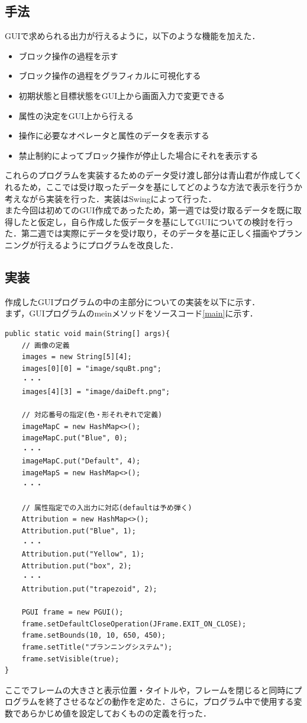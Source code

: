 \documentclass[12pt]{jarticle}
\begin{document}
\subsection{手法}
GUIで求められる出力が行えるように，以下のような機能を加えた．

\begin{itemize}
\item ブロック操作の過程を示す
\item ブロック操作の過程をグラフィカルに可視化する
\item 初期状態と目標状態をGUI上から画面入力で変更できる
\item 属性の決定をGUI上から行える
\item 操作に必要なオペレータと属性のデータを表示する
\item 禁止制約によってブロック操作が停止した場合にそれを表示する
\end{itemize}

これらのプログラムを実装するためのデータ受け渡し部分は青山君が作成してくれるため，ここでは受け取ったデータを基にしてどのような方法で表示を行うか考えながら実装を行った．実装はSwingによって行った．\\

また今回は初めてのGUI作成であったため，第一週では受け取るデータを既に取得したと仮定し，自ら作成した仮データを基にしてGUIについての検討を行った．第二週では実際にデータを受け取り，そのデータを基に正しく描画やプランニングが行えるようにプログラムを改良した．\\

\subsection{実装}
作成したGUIプログラムの中の主部分についての実装を以下に示す．\\

まず，GUIプログラムのmeinメソッドをソースコード\ref{main}に示す．
\begin{lstlisting}[caption=mainメソッド,label=main]
public static void main(String[] args){
	// 画像の定義
	images = new String[5][4];
	images[0][0] = "image/squBt.png";
	・・・
	images[4][3] = "image/daiDeft.png";

	// 対応番号の指定(色・形それぞれで定義)
	imageMapC = new HashMap<>();
	imageMapC.put("Blue", 0);
	・・・
	imageMapC.put("Default", 4);
	imageMapS = new HashMap<>();
	・・・

	// 属性指定での入出力に対応(defaultは予め弾く)
	Attribution = new HashMap<>();
	Attribution.put("Blue", 1);
	・・・
	Attribution.put("Yellow", 1);
	Attribution.put("box", 2);
	・・・
	Attribution.put("trapezoid", 2);

	PGUI frame = new PGUI();
	frame.setDefaultCloseOperation(JFrame.EXIT_ON_CLOSE);
	frame.setBounds(10, 10, 650, 450);
	frame.setTitle("プランニングシステム");
	frame.setVisible(true);
}
\end{lstlisting}
ここでフレームの大きさと表示位置・タイトルや，フレームを閉じると同時にプログラムを終了させるなどの動作を定めた．さらに，プログラム中で使用する変数であらかじめ値を設定しておくものの定義を行った．\\
\end{document}
